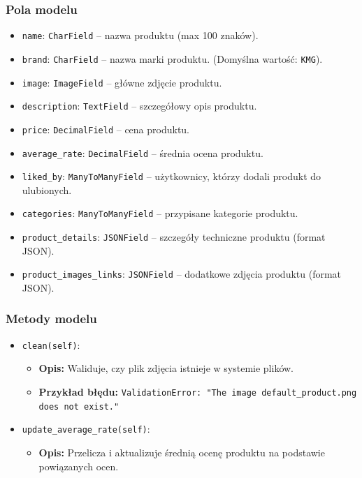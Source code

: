 \documentclass[12pt,a4paper,oneside]{article}
\theoremstyle{definition}
\numberwithin{equation}{section}
\begin{document}
\subsubsection{Pola modelu}
\begin{itemize}
    \item \texttt{name}: \texttt{CharField} – nazwa produktu (max 100 znaków).
    \item \texttt{brand}: \texttt{CharField} – nazwa marki produktu. (Domyślna wartość: \texttt{KMG}).
    \item \texttt{image}: \texttt{ImageField} – główne zdjęcie produktu.
    \item \texttt{description}: \texttt{TextField} – szczegółowy opis produktu.
    \item \texttt{price}: \texttt{DecimalField} – cena produktu.
    \item \texttt{average\_rate}: \texttt{DecimalField} – średnia ocena produktu.
    \item \texttt{liked\_by}: \texttt{ManyToManyField} – użytkownicy, którzy dodali produkt do ulubionych.
    \item \texttt{categories}: \texttt{ManyToManyField} – przypisane kategorie produktu.
    \item \texttt{product\_details}: \texttt{JSONField} – szczegóły techniczne produktu (format JSON).
    \item \texttt{product\_images\_links}: \texttt{JSONField} – dodatkowe zdjęcia produktu (format JSON).
\end{itemize}

\subsubsection{Metody modelu}
\begin{itemize}
    \item \texttt{clean(self)}:
    \begin{itemize}
        \item \textbf{Opis:} Waliduje, czy plik zdjęcia istnieje w systemie plików.
        \item \textbf{Przykład błędu:} 
            \subsubitem \texttt{ValidationError: "The image default\_product.png does not exist."}
    \end{itemize}
    \item \texttt{update\_average\_rate(self)}:
    \begin{itemize}
        \item \textbf{Opis:} Przelicza i aktualizuje średnią ocenę produktu na podstawie powiązanych ocen.
    \end{itemize}
\end{itemize}
\end{document}
